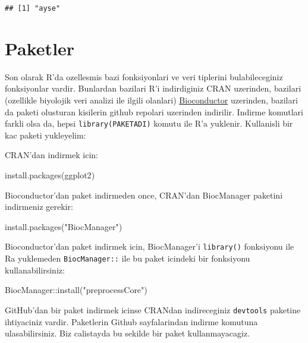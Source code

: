 \documentclass[
]{book}
\newenvironment{Shaded}{\begin{snugshade}}{\end{snugshade}}
\newcommand{\FunctionTok}[1]{\textcolor[rgb]{0.00,0.00,0.00}{#1}}
\newcommand{\NormalTok}[1]{#1}
\newcommand{\SpecialCharTok}[1]{\textcolor[rgb]{0.00,0.00,0.00}{#1}}
\newcommand{\StringTok}[1]{\textcolor[rgb]{0.31,0.60,0.02}{#1}}
\begin{document}
\begin{verbatim}
## [1] "ayse"
\end{verbatim}

\hypertarget{paketler}{%
\section{Paketler}\label{paketler}}

Son olarak R'da ozellesmis bazi fonksiyonlari ve veri tiplerini bulabileceginiz fonksiyonlar vardir. Bunlardan bazilari R'i indirdiginiz CRAN uzerinden, bazilari (ozellikle biyolojik veri analizi ile ilgili olanlari) \href{https://www.bioconductor.org/}{Bioconductor} uzerinden, bazilari da paketi olusturan kisilerin github repolari uzerinden indirilir. Indirme komutlari farkli olsa da, hepsi \texttt{library(PAKETADI)} komutu ile R'a yuklenir. Kullanisli bir kac paketi yukleyelim:

CRAN'dan indirmek icin:

\begin{Shaded}
\begin{Highlighting}[]
\FunctionTok{install.packages}\NormalTok{(}\StringTok{\textquotesingle{}ggplot2\textquotesingle{}}\NormalTok{)}
\end{Highlighting}
\end{Shaded}

Bioconductor'dan paket indirmeden once, CRAN'dan BiocManager paketini indirmeniz gerekir:

\begin{Shaded}
\begin{Highlighting}[]
\FunctionTok{install.packages}\NormalTok{(}\StringTok{"BiocManager"}\NormalTok{)}
\end{Highlighting}
\end{Shaded}

Bioconductor'dan paket indirmek icin, BiocManager'i \texttt{library()} fonksiyonu ile Ra yuklemeden \texttt{BiocManager::} ile bu paket icindeki bir fonksiyonu kullanabilirsiniz:

\begin{Shaded}
\begin{Highlighting}[]
\NormalTok{BiocManager}\SpecialCharTok{::}\FunctionTok{install}\NormalTok{(}\StringTok{"preprocessCore"}\NormalTok{)}
\end{Highlighting}
\end{Shaded}

GitHub'dan bir paket indirmek icinse CRANdan indireceginiz \texttt{devtools} paketine ihtiyaciniz vardir. Paketlerin Github sayfalarindan indirme komutuna ulasabilirsiniz. Biz calistayda bu sekilde bir paket kullanmayacagiz.
\end{document}
